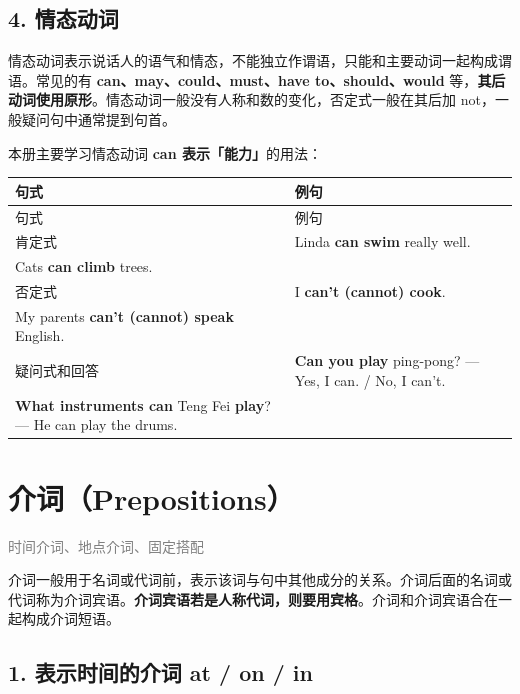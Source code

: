\documentclass[11pt,a4paper]{ctexart}
\begin{document}
\subsection*{4. 情态动词}

情态动词表示说话人的语气和情态，不能独立作谓语，只能和主要动词一起构成谓语。常见的有 \textbf{can、may、could、must、have to、should、would} 等，\textbf{其后动词使用原形}。情态动词一般没有人称和数的变化，否定式一般在其后加 not，一般疑问句中通常提到句首。

本册主要学习情态动词 \textbf{can 表示「能力」}的用法：

{\footnotesize
\begin{longtable}{p{6.70cm}p{6.70cm}}
\hline
句式 & 例句 \\
\hline
\endfirsthead
\hline
句式 & 例句 \\
\hline
\endhead
\hline
\endfoot
肯定式 & Linda \textbf{can swim} really well.\\ Cats \textbf{can climb} trees. \\
否定式 & I \textbf{can’t (cannot) cook}.\\ My parents \textbf{can’t (cannot) speak} English. \\
疑问式和回答 & \textbf{Can you play} ping-pong? — Yes, I can. / No, I can’t.\\ \textbf{What instruments can} Teng Fei \textbf{play}? — He can play the drums. \\
\end{longtable}
}

\section{介词（Prepositions）}
\noindent\textcolor{gray}{时间介词、地点介词、固定搭配}\par\smallskip
介词一般用于名词或代词前，表示该词与句中其他成分的关系。介词后面的名词或代词称为介词宾语。\textbf{介词宾语若是人称代词，则要用宾格}。介词和介词宾语合在一起构成介词短语。

\subsection*{1. 表示时间的介词 at / on / in}
\end{document}
